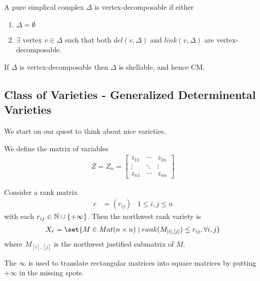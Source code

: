 \begin{definition}
    A pure simplical complex $\Delta$ is vertex-decomposable if either
    \begin{enumerate}
        \item $\Delta = \emptyset$
        \item $\exists$ vertex $v \in \Delta$ such that both $del(v, \Delta) $ and $link(v,\Delta)$ are vertex-decomposable.
    \end{enumerate}
\end{definition}

\begin{theorem}
    If $\Delta$ is vertex-decomposable then $\Delta$ is shellable, and hence CM.
\end{theorem}

\subsection{Class of Varieties - Generalized Determinental Varieties}



We start on our quest to think about nice varieties.

\begin{definition}
    We define the matrix of variables
    \begin{align*}
        Z = Z_n =
        \begin{bmatrix}
        z_{11} & \cdots & z_{1n}\\
        \vdots & \ddots & \vdots\\
        z_{n1} & \cdots & z_{nn}
        \end{bmatrix}
    \end{align*}
\end{definition}

\begin{definition}
    Consider a rank matrix
    \begin{align*}
        r &= (r_{ij}) &1 \leq i,j \leq n
    \end{align*}
    with each $r_{ij} \in \mathbb{N} \cup \{ + \infty \}$. Then the northwest rank variety is
    \begin{align*}
        X_r = \set{ M \in Mat(n \times n) \mid rank (M_{[i], [j] } ) \leq r_{ij}, \forall i,j }
    \end{align*}
    where $M_{[i], [j] }$ is the northwest justified submatrix of $M$.
\end{definition}
The $\infty$ is used to translate rectangular matrices into square matrices by putting $ + \infty$ in the missing spots.

